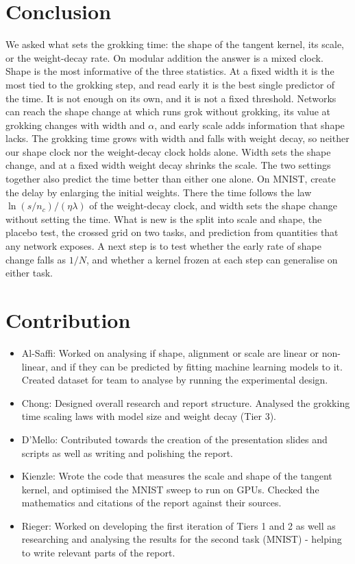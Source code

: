 \documentclass[a4paper,11pt]{article} %
\begin{document}
\section{Conclusion}\label{sec:conclusion}

We asked what sets the grokking time: the shape of the tangent kernel, its
scale, or the weight-decay rate. On modular addition the answer is a mixed
clock. Shape is the most informative of the three statistics. At a fixed width
it is the most tied to the grokking step, and read early it is the best single
predictor of the time. It is not enough on its own, and it is not a fixed
threshold. Networks can reach the shape change at which runs grok without
grokking, its value at grokking changes with width and $\alpha$, and early
scale adds information that shape lacks. The grokking time grows with
width and falls with weight
decay, so neither our shape clock nor the weight-decay clock holds alone. Width
sets the shape change, and at a fixed width weight decay shrinks the scale.
The two settings together also predict the time better than either one alone.
On MNIST, \citet{liuOmnigrokGrokkingAlgorithmic2023} create the delay by
enlarging the initial weights. There the time follows the law
\(\ln(s/n_c)/(\eta\lambda)\) of the weight-decay clock, and width sets the
shape change without setting the time. What is new is the
split into scale and shape, the placebo test,
the crossed grid on two tasks, and prediction from quantities that any network
exposes. A next step is to test whether the early rate of shape change falls as
$1/N$, and whether a kernel frozen at each step can generalise on either task.

\section*{Contribution}

\begin{itemize}
  \item Al-Saffi: Worked on analysing if shape, alignment or scale
    are linear or non-linear, and if they can be predicted by fitting
    machine learning models to it. Created dataset for team to
    analyse by running the experimental design.
  \item Chong: Designed overall research and report structure. Analysed the grokking time scaling laws with model size and weight decay (Tier 3). 
  \item D'Mello: Contributed towards the creation of the presentation slides and scripts as well as writing and polishing the report.
  \item Kienzle: Wrote the code that measures the scale and shape of the tangent kernel, and optimised the MNIST sweep to run on GPUs. Checked the mathematics and citations of the report against their sources. 
  \item Rieger: Worked on developing the first iteration of Tiers 1 and 2 as well as researching and analysing the results for the second task (MNIST) - helping to write relevant parts of the report.
\end{itemize}
\end{document}

